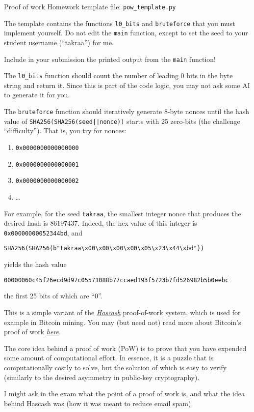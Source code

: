 \documentclass{homework}
\begin{document}
\newpage

\begin{task}{Proof of work}
  Homework template file: \texttt{pow\_template.py}

  The template contains the functions \texttt{l0\_bits} and \texttt{bruteforce} that you must implement yourself.
  Do not edit the \texttt{main} function, except to set the seed to your student username (\enquote{takraa}) for me.

  Include in your submission the printed output from the \texttt{main} function!

  The \texttt{l0\_bits} function should count the number of leading 0 bits in the byte string and return it.
  Since this is part of the code logic, you may not ask some AI to generate it for you.

  The \texttt{bruteforce} function should iteratively generate 8-byte nonces until the hash value of \texttt{SHA256(SHA256(seed||nonce))}
  starts with 25 zero-bits (the challenge \enquote{difficulty}). That is, you try for nonces:
  \begin{enumerate}
    \item \texttt{0x0000000000000000}
    \item \texttt{0x0000000000000001}
    \item \texttt{0x0000000000000002}
    \item \dots
  \end{enumerate}

  For example, for the seed \texttt{takraa}, the smallest integer nonce that produces the desired hash is $86197437$.
  Indeed, the hex value of this integer is \texttt{0x00000000052344bd}, and
   \begin{Verbatim}
SHA256(SHA256(b"takraa\x00\x00\x00\x00\x05\x23\x44\xbd"))
  \end{Verbatim}
  yields the hash value
  \begin{Verbatim}
00000060c45f26ecd9d97c05571088b77ccaed193f5723b7fd526982b5b0eebc
  \end{Verbatim}
  the first 25 bits of which are \enquote{0}.
\end{task}

This is a simple variant of the \href{https://en.wikipedia.org/wiki/Hashcash}{\textit{Hascash}} proof-of-work system, which is used for example in Bitcoin mining.
You may (but need not) read more about Bitcoin's proof of work \href{https://en.bitcoin.it/wiki/Proof_of_work}{\textit{here}}.

The core idea behind a proof of work (PoW) is to prove that you have expended some amount of computational effort.
In essence, it is a puzzle that is computationally costly to solve, but the solution of which is easy to verify (similarly to the desired asymmetry in public-key cryptography).

I might ask in the exam what the point of a proof of work is, and what the idea behind Hascash was (how it was meant to reduce email spam).
\end{document}
